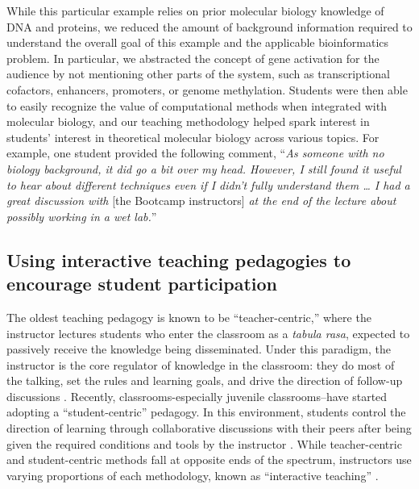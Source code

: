 While this particular example relies on prior molecular biology knowledge of DNA and proteins, we reduced the amount of background information required to understand the overall goal of this example and the applicable bioinformatics problem. In particular, we abstracted the concept of gene activation for the audience by not mentioning other parts of the system, such as transcriptional cofactors, enhancers, promoters, or genome methylation. Students were then able to easily recognize the value of computational methods when integrated with molecular biology, and our teaching methodology helped spark interest in students' interest in theoretical molecular biology across various topics. For example, one student provided the following comment, “\textit{As someone with no biology background, it did go a bit over my head. However, I still found it useful to hear about different techniques even if I didn't fully understand them … I had a great discussion with} [the Bootcamp instructors] \textit{at the end of the lecture about possibly working in a wet lab.}” 

\subsection{Using interactive teaching pedagogies to encourage student participation} 

The oldest teaching pedagogy is known to be “teacher-centric,” where the instructor lectures students who enter the classroom as a \textit{tabula rasa}, expected to passively receive the knowledge being disseminated. Under this paradigm, the instructor is the core regulator of knowledge in the classroom: they do most of the talking, set the rules and learning goals, and drive the direction of follow-up discussions \cite{freire2000}. Recently, classrooms-especially juvenile classrooms--have started adopting a “student-centric” pedagogy. In this environment, students control the direction of learning through collaborative discussions with their peers after being given the required conditions and tools by the instructor \cite{estes2004,wright2011,brush2000}. While teacher-centric and student-centric methods fall at opposite ends of the spectrum, instructors use varying proportions of each methodology, known as “interactive teaching” \cite{senthamarai2018,kennewell2008}.

